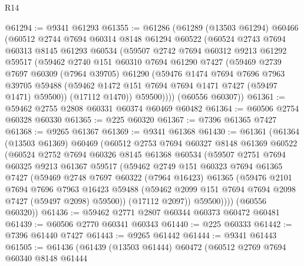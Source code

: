 \begin{lexlean}{R14}
\begin{coremodule}
@61294 := @9341 @61293
@61355 := @61286
    (@61289
      (@13503 @61294)
      @60466
      (@60512
        @2744
        @7694
        @60314
        @8148
        @61294
        @60522
        (@60524
          @2743
          @7694
          @60313
          @8145
          @61293
          @60534
          (@59507
            @2742
            @7694
            @60312
            @9213
            @61292
            @59517
            (@59462
              @2740
              @151
              @60310
              @7694
              @61290
              @7427
              (@59469
                @2739
                @7697
                @60309
                (@7964 @39705)
                @61290
                (@59476
                  @1474
                  @7694
                  @7696
                  @7963
                  @39705
                  @59488
                  (@59462 @1472 @151 @7694 @7694 @1471 @7427 (@59497 @1471) @59500))
                (@17112 @1470))
              @59500))))
      (@60556 @60307))
@61361 := @59462 @2755 @2808 @60331 @60374 @60469 @60482
@61364 := @60506 @2754 @60328 @60330
@61365 := @225 @60320
@61367 := @7396 @61365 @7427
@61368 := @9265 @61367
@61369 := @9341 @61368
@61430 := @61361
    (@61364
      (@13503 @61369)
      @60469
      (@60512
        @2753
        @7694
        @60327
        @8148
        @61369
        @60522
        (@60524
          @2752
          @7694
          @60326
          @8145
          @61368
          @60534
          (@59507
            @2751
            @7694
            @60325
            @9213
            @61367
            @59517
            (@59462
              @2749
              @151
              @60323
              @7694
              @61365
              @7427
              (@59469
                @2748
                @7697
                @60322
                (@7964 @16423)
                @61365
                (@59476
                  @2101
                  @7694
                  @7696
                  @7963
                  @16423
                  @59488
                  (@59462 @2099 @151 @7694 @7694 @2098 @7427 (@59497 @2098) @59500))
                (@17112 @2097))
              @59500))))
      (@60556 @60320))
@61436 := @59462 @2771 @2807 @60344 @60373 @60472 @60481
@61439 := @60506 @2770 @60341 @60343
@61440 := @225 @60333
@61442 := @7396 @61440 @7427
@61443 := @9265 @61442
@61444 := @9341 @61443
@61505 := @61436
    (@61439
      (@13503 @61444)
      @60472
      (@60512
        @2769
        @7694
        @60340
        @8148
        @61444

\end{coremodule}
\end{lexlean}
